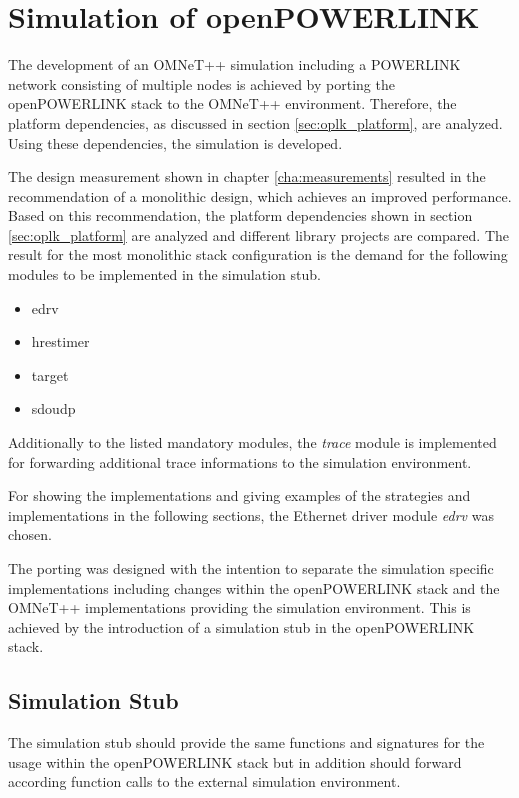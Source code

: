 \chapter{Simulation of openPOWERLINK}
\label{cha:porting}
\begin{sloppypar}
The development of an OMNeT++ simulation including a POWERLINK network consisting of multiple nodes is achieved by porting the openPOWERLINK stack to the OMNeT++ environment.
Therefore, the platform dependencies, as discussed in section \ref{sec:oplk_platform}, are analyzed.
Using these dependencies, the simulation is developed.
\end{sloppypar}

The design measurement shown in chapter \ref{cha:measurements} resulted in the recommendation of a monolithic design, which achieves an improved performance.
Based on this recommendation, the platform dependencies shown in section \ref{sec:oplk_platform} are analyzed and different library projects are compared.
The result for the most monolithic stack configuration is the demand for the following modules to be implemented in the simulation stub.

\begin{itemize}
    \item edrv
    \item hrestimer
    \item target
    \item sdoudp
\end{itemize}

Additionally to the listed mandatory modules, the \emph{trace} module is implemented for forwarding additional trace informations to the simulation environment.

For showing the implementations and giving examples of the strategies and implementations in the following sections, the Ethernet driver module \emph{edrv} was chosen.

The porting was designed with the intention to separate the simulation specific implementations including changes within the openPOWERLINK stack and the OMNeT++ implementations providing the simulation environment.
This is achieved by the introduction of a simulation stub in the openPOWERLINK stack.

\section{Simulation Stub}
\label{sec:porting_simstub}

The simulation stub should provide the same functions and signatures for the usage within the openPOWERLINK stack but in addition should forward according function calls to the external simulation environment.

